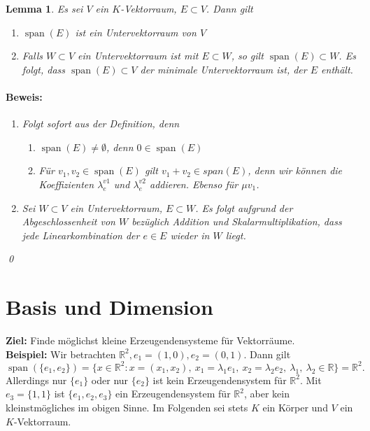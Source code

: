 \documentclass{report}
\newcommand{\lb}{\lambda}
\newcommand{\R}{\mathbb{R}}
\DeclareMathOperator{\Span}{span}
\theoremstyle{customrem}
\theoremstyle{customdef}
\newtheorem{lemma}[definition]{Lemma}
\renewenvironment{proof}{\paragraph{Beweis: }}{\qed}
\theoremstyle{customenv}
\begin{document}
	\begin{lemma}
		Es sei \(V\) ein \(K\)-Vektorraum, \(E \subset V\). Dann gilt
		\begin{enumerate}
			\item \(\Span(E)\) ist ein Untervektorraum von \(V\)
			\item Falls \(W \subset V\) ein Untervektorraum ist mit \(E \subset W\), so gilt \(\Span(E) \subset W\). Es folgt, dass \(\Span(E) \subset V\) der minimale Untervektorraum ist, der \(E\) enthält.
		\end{enumerate}

		\begin{proof}
			\begin{enumerate}
				\item Folgt sofort aus der Definition, denn
				\begin{enumerate}
					\item \(\Span(E) \neq \emptyset\), denn \(0 \in \Span(E)\)
					\item Für \(v_1, v_2 \in \Span(E)\) gilt \(v_1 + v_2 \in span(E)\), denn wir können die Koeffizienten \(\lb_e^{v1}\) und \(\lb_e^{v2}\) addieren. Ebenso für \(\mu v_1\).
				\end{enumerate}
				\item Sei \(W \subset V\) ein Untervektorraum, \(E \subset W\). Es folgt aufgrund der Abgeschlossenheit von \(W\) bezüglich Addition und Skalarmultiplikation, dass jede Linearkombination der \(e \in E\) wieder in \(W\) liegt.
			\end{enumerate}
		\end{proof}
	\end{lemma}

\section{Basis und Dimension}
	\textbf{Ziel:} Finde möglichst kleine Erzeugendensysteme für Vektorräume.\\
	\textbf{Beispiel:} Wir betrachten \(\R^2, e_1=(1, 0), e_2 = (0,1)\). Dann gilt
	 \[
	 \Span(\{e_1, e_2\}) = \{x \in \R^2 : x = (x_1, x_2),\ x_1 = \lb_1 e_1,\ x_2 = \lb_2 e_2,\ \lb_1,\ \lb_2 \in \R\} = \R^2.
	 \]
	Allerdings nur \(\{e_1\}\) oder nur \(\{e_2\}\) ist kein Erzeugendensystem für \(\R^2\). Mit \(e_3 = \{1, 1\}\) ist \(\{e_1, e_2, e_3\}\) ein Erzeugendensystem für \(\R^2\), aber kein kleinstmögliches im obigen Sinne.
	Im Folgenden sei stets \(K\) ein Körper und \(V\) ein \(K\)-Vektorraum.
\end{document}
